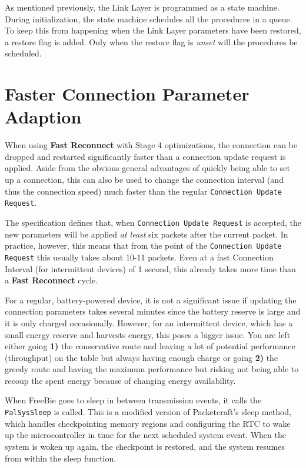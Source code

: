 As mentioned previously, the Link Layer is programmed as a state machine. During initialization, the state machine schedules all the procedures in a queue. To keep this from happening when the Link Layer parameters have been restored, a restore flag is added. Only when the restore flag is \textit{unset} will the procedures be scheduled.

\section{Faster Connection Parameter Adaption}
When using \textbf{Fast Reconnect} with Stage 4 optimizations, the connection can be dropped and restarted significantly faster than a connection update request is applied. Aside from the obvious general advantages of quickly being able to set up a connection, this can also be used to change the connection interval (and thus the connection speed) much faster than the regular \texttt{Connection Update Request}.

The specification defines that, when \texttt{Connection Update Request} is accepted, the new parameters will be applied \textit{at least} six packets after the current packet. In practice, however, this means that from the point of the \texttt{Connection Update Request} this usually takes about 10-11 packets. Even at a fast Connection Interval (for intermittent devices) of 1 second, this already takes more time than a \textbf{Fast Reconnect} cycle. 

For a regular, battery-powered device, it is not a significant issue if updating the connection parameters takes several minutes since the battery reserve is large and it is only charged occasionally. However, for an intermittent device, which has a small energy reserve and harvests energy, this poses a bigger issue. You are left either going \textbf{1)} the conservative route and leaving a lot of potential performance (throughput) on the table but always having enough charge or going \textbf{2)} the greedy route and having the maximum performance but risking not being able to recoup the spent energy because of changing energy availability.

When FreeBie goes to sleep in between transmission events, it calls the \texttt{PalSysSleep} is called. This is a modified version of Packetcraft's sleep method, which handles checkpointing memory regions and configuring the RTC to wake up the microcontroller in time for the next scheduled system event. When the system is woken up again, the checkpoint is restored, and the system resumes from within the sleep function. 

